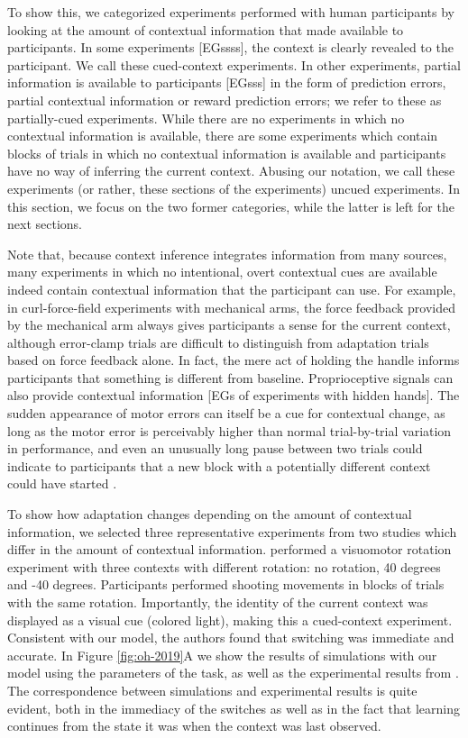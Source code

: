\documentclass[a4paper,doc,floatsintext,natbib]{apa6}
\def \fref #1{Figure \ref{#1}}     %
\begin{document}
To show this, we categorized experiments performed with human participants by looking at the amount of contextual information that made available to participants. In some experiments [EGssss], the context is clearly revealed to the participant. We call these cued-context experiments. In other experiments, partial information is available to participants [EGsss] in the form of prediction errors, partial contextual information or reward prediction errors; we refer to these as partially-cued experiments. While there are no experiments in which no contextual information is available, there are some experiments which contain blocks of trials in which no contextual information is available and participants have no way of inferring the current context. Abusing our notation, we call these experiments (or rather, these sections of the experiments) uncued experiments. In this section, we focus on the two former categories, while the latter is left for the next sections.

Note that, because context inference integrates information from many sources, many experiments in which no intentional, overt contextual cues are available indeed contain contextual information that the participant can use. For example, in curl-force-field experiments with mechanical arms, the force feedback provided by the mechanical arm always gives participants a sense for the current context, although error-clamp trials are difficult to distinguish from adaptation trials based on force feedback alone. In fact, the mere act of holding the handle informs participants that something is different from baseline. Proprioceptive signals can also provide contextual information [EGs of experiments with hidden hands]. The sudden appearance of motor errors can itself be a cue for contextual change, as long as the motor error is perceivably higher than normal trial-by-trial variation in performance, and even an unusually long pause between two trials could indicate to participants that a new block with a potentially different context could have started \cite[e.g.][]{Ethier_Spontaneous_2008}.

To show how adaptation changes depending on the amount of contextual information, we selected three representative experiments from two studies which differ in the amount of contextual information. \cite{Kim_Neural_2015} performed a visuomotor rotation experiment with three contexts with different rotation: no rotation, 40 degrees and -40 degrees. Participants performed shooting movements in blocks of trials with the same rotation. Importantly, the identity of the current context was displayed as a visual cue (colored light), making this a cued-context experiment. Consistent with our model, the authors found that switching was immediate and accurate. In \fref{fig:oh-2019}A we show the results of simulations with our model using the parameters of the task, as well as the experimental results from \cite{Kim_Neural_2015}. The correspondence between simulations and experimental results is quite evident, both in the immediacy of the switches as well as in the fact that learning continues from the state it was when the context was last observed.
\end{document}
